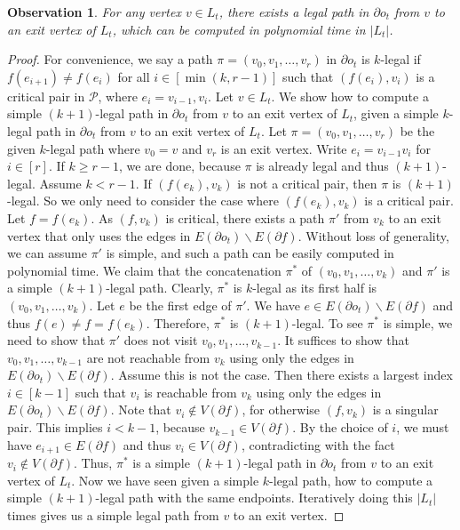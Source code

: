 \documentclass[a4paper,11pt]{article}
\numberwithin{lemma}{section}
\newtheorem{observation}[lemma]{Observation}
\begin{document}
\begin{observation}\label{obs-wbpath}
For any vertex $v \in L_t$, there exists a legal path in $\partial o_t$ from $v$ to an exit vertex of $L_t$, which can be computed in polynomial time in $|L_t|$.
\end{observation}
\begin{proof}
For convenience, we say a path $\pi = (v_0,v_1,\dots,v_r)$ in $\partial o_t$ is $k$-legal if $f(e_{i+1}) \neq f(e_i)$ for all $i \in [\min{(k,r-1)}]$ such that $(f(e_i),v_i)$ is a critical pair in $\mathcal{P}$, where $e_i = v_{i-1},v_i$.
Let $v \in L_t$.
We show how to compute a simple $(k+1)$-legal path in $\partial o_t$ from $v$ to an exit vertex of $L_t$, given a simple $k$-legal path in $\partial o_t$ from $v$ to an exit vertex of $L_t$.
Let $\pi = (v_0,v_1,\dots,v_r)$ be the given $k$-legal path where $v_0 = v$ and $v_r$ is an exit vertex.
Write $e_i = v_{i-1}v_i$ for $i \in [r]$.
If $k \geq r-1$, we are done, because $\pi$ is already legal and thus $(k+1)$-legal.
Assume $k < r-1$.
If $(f(e_k),v_k)$ is not a critical pair, then $\pi$ is $(k+1)$-legal.
So we only need to consider the case where $(f(e_k),v_k)$ is a critical pair.
Let $f = f(e_k)$.
As $(f,v_k)$ is critical, there exists a path $\pi'$ from $v_k$ to an exit vertex that only uses the edges in $E(\partial o_t) \backslash E(\partial f)$.
Without loss of generality, we can assume $\pi'$ is simple, and such a path can be easily computed in polynomial time.
We claim that the concatenation $\pi^*$ of $(v_0,v_1,\dots,v_k)$ and $\pi'$ is a simple $(k+1)$-legal path.
Clearly, $\pi^*$ is $k$-legal as its first half is $(v_0,v_1,\dots,v_k)$.
Let $e$ be the first edge of $\pi'$.
We have $e \in E(\partial o_t) \backslash E(\partial f)$ and thus $f(e) \neq f = f(e_k)$.
Therefore, $\pi^*$ is $(k+1)$-legal.
To see $\pi^*$ is simple, we need to show that $\pi'$ does not visit $v_0,v_1,\dots,v_{k-1}$.
It suffices to show that $v_0,v_1,\dots,v_{k-1}$ are not reachable from $v_k$ using only the edges in $E(\partial o_t) \backslash E(\partial f)$.
Assume this is not the case.
Then there exists a largest index $i \in [k-1]$ such that $v_i$ is reachable from $v_k$ using only the edges in $E(\partial o_t) \backslash E(\partial f)$.
Note that $v_i \notin V(\partial f)$, for otherwise $(f,v_k)$ is a singular pair.
This implies $i < k-1$, because $v_{k-1} \in V(\partial f)$.
By the choice of $i$, we must have $e_{i+1} \in E(\partial f)$ and thus $v_i \in V(\partial f)$, contradicting with the fact $v_i \notin V(\partial f)$.
Thus, $\pi^*$ is a simple $(k+1)$-legal path in $\partial o_t$ from $v$ to an exit vertex of $L_t$.
Now we have seen given a simple $k$-legal path, how to compute a simple $(k+1)$-legal path with the same endpoints.
Iteratively doing this $|L_t|$ times gives us a simple legal path from $v$ to an exit vertex.
\end{proof}
\end{document}
